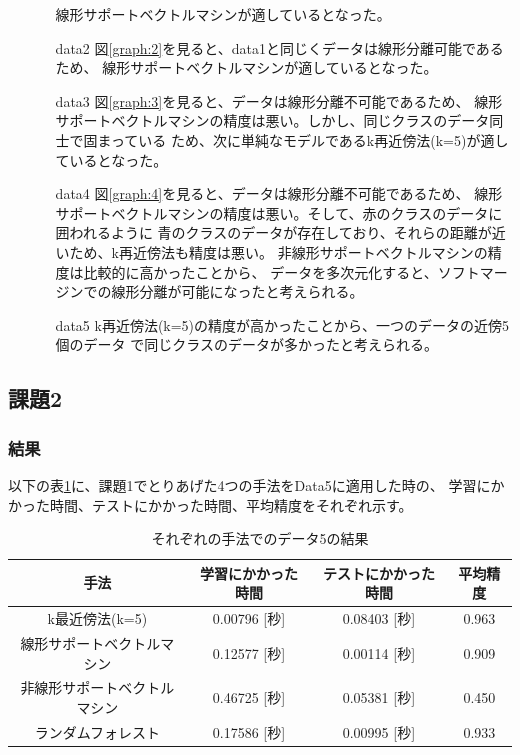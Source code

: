 \begin{itemize}
\begin{itemize}
    線形サポートベクトルマシンが適しているとなった。
    \item[data2] 図\ref{graph:2}を見ると、data1と同じくデータは線形分離可能であるため、
    線形サポートベクトルマシンが適しているとなった。
    \item[data3] 図\ref{graph:3}を見ると、データは線形分離不可能であるため、
    線形サポートベクトルマシンの精度は悪い。しかし、同じクラスのデータ同士で固まっている
    ため、次に単純なモデルであるk再近傍法(k=5)が適しているとなった。
    \item[data4] 図\ref{graph:4}を見ると、データは線形分離不可能であるため、
    線形サポートベクトルマシンの精度は悪い。そして、赤のクラスのデータに囲われるように
    青のクラスのデータが存在しており、それらの距離が近いため、k再近傍法も精度は悪い。
    非線形サポートベクトルマシンの精度は比較的に高かったことから、
    データを多次元化すると、ソフトマージンでの線形分離が可能になったと考えられる。
    \item[data5] k再近傍法(k=5)の精度が高かったことから、一つのデータの近傍5個のデータ
    で同じクラスのデータが多かったと考えられる。
  \end{itemize}
\end{itemize}
\clearpage


\subsection{課題2}
\subsubsection{結果}
以下の表\ref{table:5}に、課題1でとりあげた4つの手法をData5に適用した時の、
学習にかかった時間、テストにかかった時間、平均精度をそれぞれ示す。

\begin{table}[hbtp]
  \centering
  \caption{それぞれの手法でのデータ5の結果}
  \label{table:5}
  \begin{tabular}{|c|c|c|c|}
    \hline
    手法 & 学習にかかった時間 & テストにかかった時間 & 平均精度\\
    \hline
    k最近傍法(k=5) & 0.00796 [秒] & 0.08403 [秒] &  0.963 \\
    線形サポートベクトルマシン & 0.12577 [秒] & 0.00114 [秒] &  0.909  \\
    非線形サポートベクトルマシン & 0.46725 [秒] & 0.05381 [秒] &  0.450 \\
    ランダムフォレスト & 0.17586 [秒] & 0.00995 [秒] &  0.933 \\
    \hline
  \end{tabular}
\end{table}

